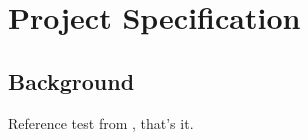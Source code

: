 \chapter{Project Specification}

\section{Background}

Reference test from \cite{peng2018deepmimic}, that's it\citep{peng2018deepmimic}.